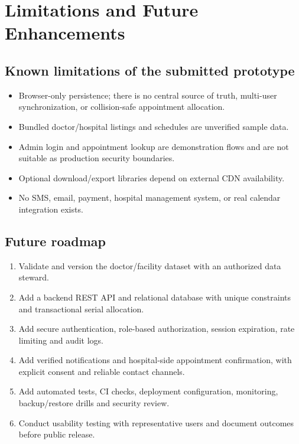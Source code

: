 \documentclass[11pt,a4paper]{article}
\begin{document}
\section{Limitations and Future Enhancements}
\subsection{Known limitations of the submitted prototype}
\begin{itemize}
  \item Browser-only persistence; there is no central source of truth, multi-user synchronization, or collision-safe appointment allocation.
  \item Bundled doctor/hospital listings and schedules are unverified sample data.
  \item Admin login and appointment lookup are demonstration flows and are not suitable as production security boundaries.
  \item Optional download/export libraries depend on external CDN availability.
  \item No SMS, email, payment, hospital management system, or real calendar integration exists.
\end{itemize}

\subsection{Future roadmap}
\begin{enumerate}
  \item Validate and version the doctor/facility dataset with an authorized data steward.
  \item Add a backend REST API and relational database with unique constraints and transactional serial allocation.
  \item Add secure authentication, role-based authorization, session expiration, rate limiting and audit logs.
  \item Add verified notifications and hospital-side appointment confirmation, with explicit consent and reliable contact channels.
  \item Add automated tests, CI checks, deployment configuration, monitoring, backup/restore drills and security review.
  \item Conduct usability testing with representative users and document outcomes before public release.
\end{enumerate}
\end{document}
